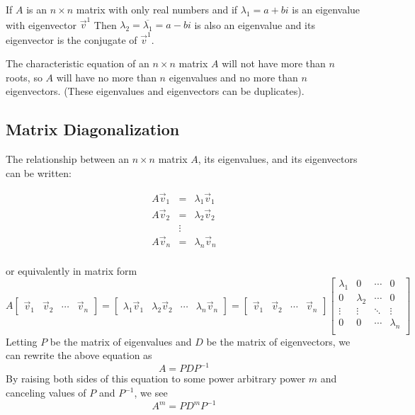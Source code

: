 \documentclass[12pt]{article}
\begin{document}
	If $A$ is an $n \times n$ matrix with only real numbers and if $\lambda_{1} = a + bi$ is an eigenvalue with eigenvector $\vec{v}^{1}$ Then $\lambda_{2} = \overline{\lambda_{1}} = a - bi$ is also an eigenvalue and its eigenvector is the conjugate of $\vec{v}^{1}$.
	
	The characteristic equation of an $n \times n$ matrix $A$ will not have more than $n$ roots, so $A$ will have no more than $n$ eigenvalues and no more than $n$ eigenvectors. (These eigenvalues and eigenvectors can be duplicates).
	
	\subsection{Matrix Diagonalization}
	
	The relationship between an $n \times n$ matrix $A$, its eigenvalues, and its eigenvectors can be written:
	
	$$\begin{matrix}
	A\vec{v}_{1}&=&\lambda_{1}\vec{v}_{1}\\
	A\vec{v}_{2}&=&\lambda_{2}\vec{v}_{2}\\
	& \vdots &\\
	A\vec{v}_{n}&=&\lambda_{n}\vec{v}_{n}\\
	\end{matrix}$$
	
	or equivalently in matrix form
	$$A
	\begin{bmatrix} \vec{v}_{1} & \vec{v}_{2} & \cdots & \vec{v}_{n} \end{bmatrix}
	=
	\begin{bmatrix} \lambda_{1}\vec{v}_{1} & \lambda_{2}\vec{v}_{2} & \cdots & \lambda_{n}\vec{v}_{n} \end{bmatrix}
	= 
	\begin{bmatrix} \vec{v}_{1} & \vec{v}_{2} & \cdots & \vec{v}_{n} \end{bmatrix}
	\begin{bmatrix}
	\lambda_{1} & 0           & \cdots & 0          \\
	0           & \lambda_{2} & \cdots & 0          \\
	\vdots      & \vdots      & \ddots & \vdots     \\
	0           & 0           & \cdots & \lambda_{n}\\
	\end{bmatrix}$$
	Letting $P$ be the matrix of eigenvalues and $D$ be the matrix of eigenvectors, we can rewrite the above equation as $$A = PDP^{-1}$$
	By raising both sides of this equation to some power arbitrary power $m$ and canceling values of $P$ and $P^{-1}$, we see $$A^{m} = PD^{m}P^{-1}$$
	
\end{document}
